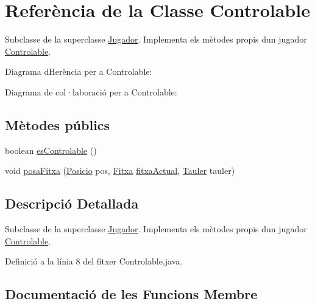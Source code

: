 \hypertarget{class_controlable}{}\section{Referència de la Classe Controlable}
\label{class_controlable}


Subclasse de la superclasse \mbox{\hyperlink{class_jugador}{Jugador}}. Implementa els mètodes propis d\textquotesingle{}un jugador \mbox{\hyperlink{class_controlable}{Controlable}}.  




Diagrama d\textquotesingle{}Herència per a Controlable\+:


Diagrama de col·laboració per a Controlable\+:
\subsection*{Mètodes públics}
\begin{DoxyCompactItemize}
\item 
boolean \mbox{\hyperlink{class_controlable_a17cb7e66755a66f96ab9da07c7e7b0e3}{es\+Controlable}} ()
\item 
void \mbox{\hyperlink{class_controlable_a2b6a322638a64197501904a8a8e8fac3}{posa\+Fitxa}} (\mbox{\hyperlink{class_posicio}{Posicio}} pos, \mbox{\hyperlink{class_fitxa}{Fitxa}} \mbox{\hyperlink{class_jugador_a221c891bd7f14049abe513c2705ac5bc}{fitxa\+Actual}}, \mbox{\hyperlink{class_tauler}{Tauler}} tauler)
\end{DoxyCompactItemize}


\subsection{Descripció Detallada}
Subclasse de la superclasse \mbox{\hyperlink{class_jugador}{Jugador}}. Implementa els mètodes propis d\textquotesingle{}un jugador \mbox{\hyperlink{class_controlable}{Controlable}}. 

Definició a la línia 8 del fitxer Controlable.\+java.



\subsection{Documentació de les Funcions Membre}
\mbox{\label{class_controlable_a17cb7e66755a66f96ab9da07c7e7b0e3}} 
